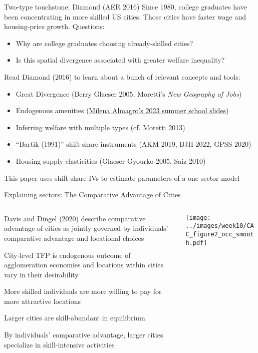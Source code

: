 \documentclass[11pt,notes=hide,aspectratio=169]{beamer}
\begin{document}
\begin{frame}{Two-type touchstone: Diamond (AER 2016)}
Since 1980, college graduates have been concentrating in more skilled US cities.
Those cities have faster wage and housing-price growth. Questions:
\begin{itemize}
	\item Why are college graduates choosing already-skilled cities?
	\item Is this spatial divergence associated with greater welfare inequality?
\end{itemize}
\medskip
Read Diamond (2016) to learn about a bunch of relevant concepts and tools:
\begin{itemize}
	\item Great Divergence (Berry Glaeser 2005, Moretti's \textit{New Geography of Jobs})
	\item Endogenous amenities (\href{https://m-almagro.github.io/UEA_Summer_School_2023.pdf}{Milena Almagro's 2023 summer school slides})
	\item Inferring welfare with multiple types (cf. Moretti 2013)
	\item ``Bartik (1991)'' shift-share instruments (AKM 2019, BJH 2022, GPSS 2020)
	\item Housing supply elasticities (Glaeser Gyourko 2005, Saiz 2010)
\end{itemize}
This paper uses shift-share IVs to estimate parameters of a one-sector model
\end{frame}
\begin{frame}{Explaining sectors: The Comparative Advantage of Cities}
\begin{columns}
\begin{column}{0.64\textwidth}
\begin{itemize}{\small
\item Davis and Dingel (2020) describe comparative advantage of cities as jointly governed by
individuals' comparative advantage and locational choices
\item City-level TFP is endogenous outcome of agglomeration economies and 
locations within cities vary in their desirability
\item More skilled individuals are more willing to pay for more attractive locations
\item Larger cities are skill-abundant in equilibrium
\item By individuals' comparative advantage, larger cities
specialize in skill-intensive activities
}\end{itemize}
\end{column}
\begin{column}{0.34\textwidth}
\texttt{[image: ../images/week10/CAC\_figure2\_occ\_smooth.pdf]}
\end{column}
\end{columns}
\end{frame}
\end{document}
